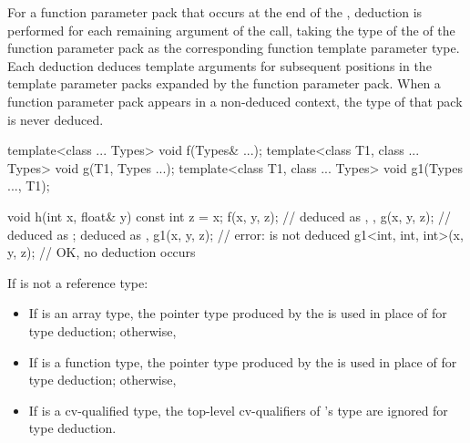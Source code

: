 For a function parameter pack that occurs at the end
of the ,
deduction is performed for each remaining argument of the call,
taking the type 
of the  of the function parameter pack
as the corresponding function template parameter type.
Each deduction deduces template arguments for subsequent positions in
the template parameter packs expanded by the function parameter pack.
When a function parameter pack appears in a non-deduced
context, the type of that pack is
never deduced.
\begin{example}
\begin{codeblock}
template<class ... Types> void f(Types& ...);
template<class T1, class ... Types> void g(T1, Types ...);
template<class T1, class ... Types> void g1(Types ..., T1);

void h(int x, float& y) {
  const int z = x;
  f(x, y, z);                   //  deduced as , , 
  g(x, y, z);                   //  deduced as ;  deduced as , 
  g1(x, y, z);                  // error:  is not deduced
  g1<int, int, int>(x, y, z);   // OK, no deduction occurs
}
\end{codeblock}
\end{example}

\pnum
If
is not a reference type:
\begin{itemize}
\item
If
is an array type, the pointer type produced by the  is used in place of
for type deduction;
otherwise,
\item
If
is a function type, the pointer type produced by the
 is used in place
of
for type
deduction; otherwise,
\item
If
is a cv-qualified type, the top-level cv-qualifiers of
's
type are ignored for type deduction.
\end{itemize}

